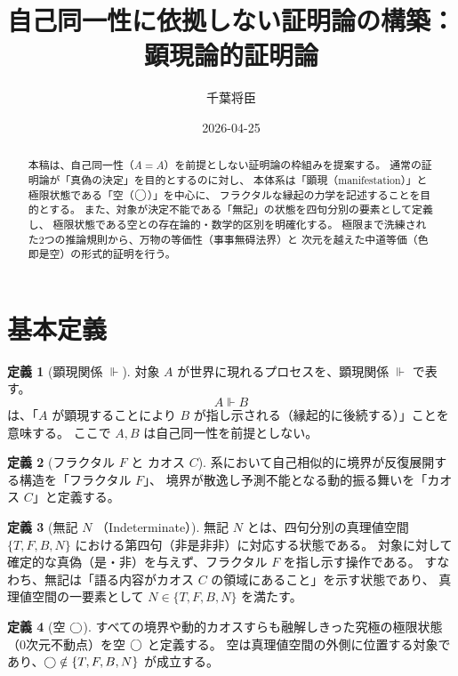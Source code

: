 \documentclass[11pt,a4paper]{article}
\theoremstyle{definition}
\newtheorem{definition}{定義}[section]
\newcommand{\aletheiai}{\Vdash} %
\begin{document}
\title{自己同一性に依拠しない証明論の構築：顕現論的証明論}
\author{千葉将臣}
\date{2026-04-25}
\maketitle

\begin{abstract}
本稿は、自己同一性（$A = A$）を前提としない証明論の枠組みを提案する。
通常の証明論が「真偽の決定」を目的とするのに対し、
本体系は「顕現（manifestation）」と極限状態である「空（$\bigcirc$）」を中心に、
フラクタルな縁起の力学を記述することを目的とする。
また、対象が決定不能である「無記」の状態を四句分別の要素として定義し、
極限状態である空との存在論的・数学的区別を明確化する。
極限まで洗練された2つの推論規則から、万物の等価性（事事無碍法界）と
次元を越えた中道等価（色即是空）の形式的証明を行う。
\end{abstract}

\section{基本定義}

\begin{definition}[顕現関係 $\aletheiai$]
対象 $A$ が世界に現れるプロセスを、顕現関係 $\aletheiai$ で表す。
$$A \aletheiai B$$
は、「$A$ が顕現することにより $B$ が指し示される（縁起的に後続する）」ことを意味する。
ここで $A, B$ は自己同一性を前提としない。
\end{definition}

\begin{definition}[フラクタル $F$ と カオス $C$]
系において自己相似的に境界が反復展開する構造を「フラクタル $F$」、
境界が散逸し予測不能となる動的振る舞いを「カオス $C$」と定義する。
\end{definition}

\begin{definition}[無記 $N$ （Indeterminate）]
無記 $N$ とは、四句分別の真理値空間 $\{T, F, B, N\}$ における第四句（非是非非）に対応する状態である。
対象に対して確定的な真偽（是・非）を与えず、フラクタル $F$ を指し示す操作である。
すなわち、無記は「語る内容がカオス $C$ の領域にあること」を示す状態であり、
真理値空間の一要素として $N \in \{T, F, B, N\}$ を満たす。
\end{definition}

\begin{definition}[空 $\bigcirc$]
すべての境界や動的カオスすらも融解しきった究極の極限状態（0次元不動点）を空 $\bigcirc$ と定義する。
空は真理値空間の外側に位置する対象であり、$\bigcirc \notin \{T, F, B, N\}$ が成立する。
\end{definition}
\end{document}
